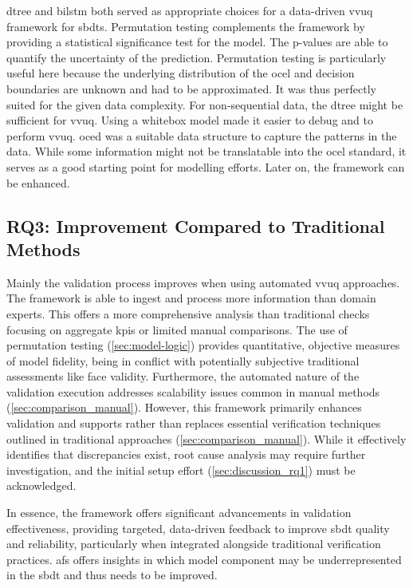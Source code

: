 \gls{dtree} and \gls{bilstm} both served as appropriate choices for a data-driven \gls{vvuq} framework for \gls{sbdt}s. Permutation testing complements the framework by providing a statistical significance test for the model. The p-values are able to quantify the uncertainty of the prediction. Permutation testing is particularly useful here because the underlying distribution of the \gls{ocel} and decision boundaries are unknown and had to be approximated. It was thus perfectly suited for the given data complexity. For non-sequential data, the \gls{dtree} might be sufficient for \gls{vvuq}. Using a whitebox model made it easier to debug and to perform \gls{vvuq}. \gls{oced} was a suitable data structure to capture the patterns in the data. While some information might not be translatable into the \gls{ocel} standard, it serves as a good starting point for modelling efforts. Later on, the framework can be enhanced.

\subsection{RQ3: Improvement Compared to Traditional Methods}
\label{sec:discussion_rq3}

Mainly the validation process improves when using automated \gls{vvuq} approaches. The framework is able to ingest and process more information than domain experts. This offers a more comprehensive analysis than traditional checks focusing on aggregate \gls{kpi}s or limited manual comparisons. The use of permutation testing (\autoref{sec:model-logic}) provides quantitative, objective measures of model fidelity, being in conflict with potentially subjective traditional assessments like face validity. Furthermore, the automated nature of the validation execution addresses scalability issues common in manual methods (\autoref{sec:comparison_manual}). However, this framework primarily enhances validation and supports rather than replaces essential verification techniques outlined in traditional approaches (\autoref{sec:comparison_manual}). While it effectively identifies that discrepancies exist, root cause analysis may require further investigation, and the initial setup effort (\autoref{sec:discussion_rq1}) must be acknowledged.

In essence, the framework offers significant advancements in validation effectiveness, providing targeted, data-driven feedback to improve \gls{sbdt} quality and reliability, particularly when integrated alongside traditional verification practices. \gls{afs} offers insights in which model component may be underrepresented in the \gls{sbdt} and thus needs to be improved.

